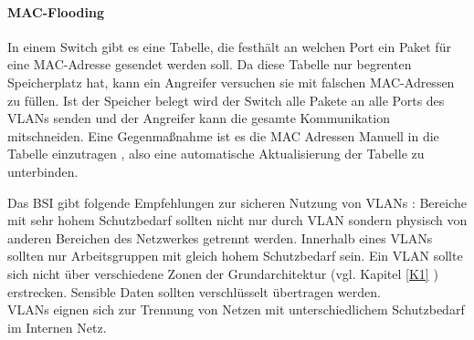  
 \paragraph{MAC-Flooding}
 \begin{addmargin}[1cm]{1cm}
 In einem Switch gibt es eine Tabelle, die festhält an welchen Port ein Paket für eine MAC-Adresse gesendet werden soll. Da diese Tabelle nur begrenten Speicherplatz hat, kann ein Angreifer versuchen sie mit falschen MAC-Adressen zu füllen. Ist der Speicher belegt wird der Switch alle Pakete an alle Ports des VLANs senden und der Angreifer kann die gesamte Kommunikation mitschneiden\cite{mehdizadeha2017virtual}.
Eine Gegenmaßnahme ist es die MAC Adressen Manuell in die Tabelle einzutragen \cite{akram2017future}, also eine automatische Aktualisierung der Tabelle zu unterbinden. \\
 
 	
 \end{addmargin}


Das BSI gibt folgende Empfehlungen zur sicheren Nutzung von VLANs \cite{bsiLogSeg}: 
Bereiche mit sehr hohem Schutzbedarf sollten nicht nur durch VLAN sondern physisch von anderen Bereichen des Netzwerkes getrennt werden. Innerhalb eines VLANs sollten nur Arbeitsgruppen mit gleich hohem Schutzbedarf sein. Ein VLAN sollte sich nicht über verschiedene Zonen der Grundarchitektur (vgl. Kapitel \ref{K1} ) erstrecken. Sensible Daten sollten verschlüsselt übertragen werden.\\
VLANs eignen sich zur Trennung von Netzen mit unterschiedlichem Schutzbedarf im Internen Netz.










